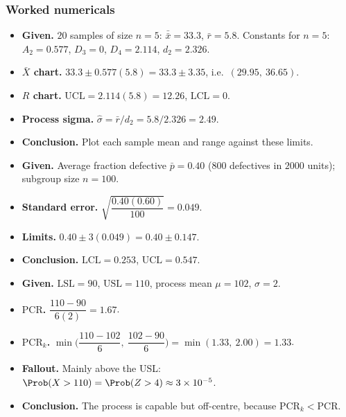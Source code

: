 \subsubsection*{Worked numericals}

\begin{example}
\begin{itemize}
  \item \textbf{Given.} $20$ samples of size $n=5$: $\bar{\bar{x}}=33.3$, $\bar{r}=5.8$. Constants for $n=5$: $A_2=0.577$, $D_3=0$, $D_4=2.114$, $d_2=2.326$.
  \item \textbf{$\bar{X}$ chart.} $33.3\pm0.577(5.8)=33.3\pm3.35$, i.e.\ $(29.95,\ 36.65)$.
  \item \textbf{$R$ chart.} $\mathrm{UCL}=2.114(5.8)=12.26$, $\mathrm{LCL}=0$.
  \item \textbf{Process sigma.} $\hat\sigma=\bar{r}/d_2=5.8/2.326=2.49$.
  \item \textbf{Conclusion.} Plot each sample mean and range against these limits.
\end{itemize}
\end{example}

\begin{example}
\begin{itemize}
  \item \textbf{Given.} Average fraction defective $\bar{p}=0.40$ ($800$ defectives in $2000$ units); subgroup size $n=100$.
  \item \textbf{Standard error.} $\sqrt{\dfrac{0.40(0.60)}{100}}=0.049$.
  \item \textbf{Limits.} $0.40\pm3(0.049)=0.40\pm0.147$.
  \item \textbf{Conclusion.} $\mathrm{LCL}=0.253$, $\mathrm{UCL}=0.547$.
\end{itemize}
\end{example}

\begin{example}
\begin{itemize}
  \item \textbf{Given.} $\mathrm{LSL}=90$, $\mathrm{USL}=110$, process mean $\mu=102$, $\sigma=2$.
  \item \textbf{$\mathrm{PCR}$.} $\dfrac{110-90}{6(2)}=1.67$.
  \item \textbf{$\mathrm{PCR}_k$.} $\min\Big(\dfrac{110-102}{6},\ \dfrac{102-90}{6}\Big)=\min(1.33,\ 2.00)=1.33$.
  \item \textbf{Fallout.} Mainly above the USL: $\Prob(X>110)=\Prob(Z>4)\approx3\times10^{-5}$.
  \item \textbf{Conclusion.} The process is capable but off-centre, because $\mathrm{PCR}_k<\mathrm{PCR}$.
\end{itemize}
\end{example}


